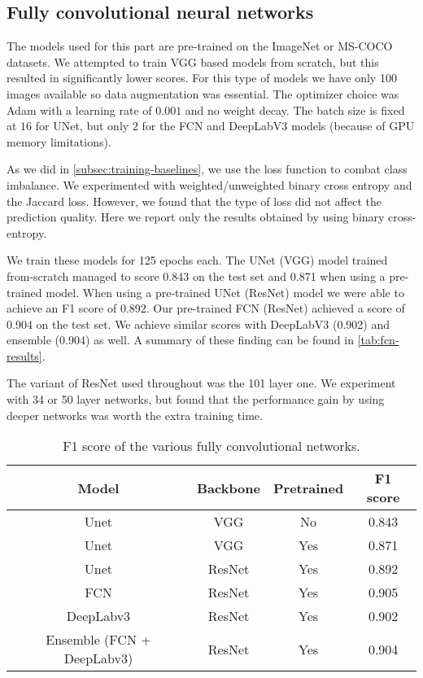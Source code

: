 \subsection{Fully convolutional neural networks} \label{subsec:training-fcn}
The models used for this part are pre-trained on the ImageNet or MS-COCO datasets. We attempted to train VGG based models from scratch, but this resulted in significantly lower scores. For this type of models we have only 100 images available so data augmentation was essential. The optimizer choice was Adam with a learning rate of $0.001$ and no weight decay. The batch size is fixed at $16$ for UNet, but only $2$ for the FCN and DeepLabV3 models (because of GPU memory limitations).

As we did in \autoref{subsec:training-baselines}, we use the loss function to combat class imbalance. We experimented with weighted/unweighted binary cross entropy and the Jaccard loss. However, we found that the type of loss did not affect the prediction quality. Here we report only the results obtained by using binary cross-entropy.

We train these models for 125 epochs each. The UNet (VGG) model trained from-scratch managed to score 0.843 on the test set and 0.871 when using a pre-trained model. When using a pre-trained UNet (ResNet) model we were able to achieve an F1 score of 0.892. Our pre-trained FCN (ResNet) achieved a score of 0.904 on the test set. We achieve similar scores with DeepLabV3 (0.902) and ensemble (0.904) as well. A summary of these finding can be found in \autoref{tab:fcn-results}.

The variant of ResNet used throughout was the 101 layer one. We experiment with 34 or 50 layer networks, but found that the performance gain by using deeper networks was worth the extra training time.


\begin{table}[h]
    \centering
    \begin{tabular}{|c|c|c|c|}
        \hline
        \textbf{Model} & \textbf{Backbone} & \textbf{Pretrained} & \textbf{F1 score} \\
        \hline
        \hline
        Unet & VGG & No & 0.843 \\
        \hline
        Unet & VGG & Yes & 0.871 \\
        \hline
        Unet & ResNet & Yes & 0.892 \\
        \hline
        FCN & ResNet & Yes & 0.905 \\
        \hline
        DeepLabv3 & ResNet & Yes & 0.902 \\
        \hline
        Ensemble (FCN + DeepLabv3) & ResNet & Yes & 0.904 \\
        \hline
    \end{tabular}
    \caption{F1 score of the various fully convolutional networks.}
    \label{tab:fcn-results}
\end{table}

